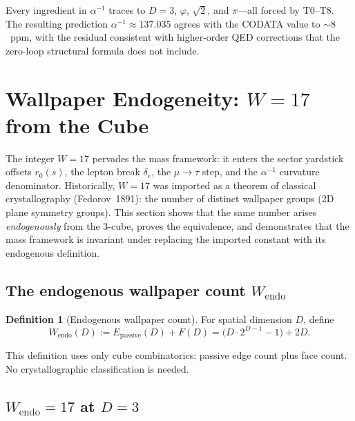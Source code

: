\documentclass[11pt,a4paper]{article}
\theoremstyle{definition}
\newtheorem{definition}[theorem]{Definition}
\theoremstyle{remark}
\newcommand{\phig}{\varphi}
\newcommand{\Epass}{E_{\mathrm{passive}}}
\begin{document}
\noindent
Every ingredient in $\alpha^{-1}$ traces to $D = 3$, $\phig$, $\sqrt{2}$,
and $\pi$---all forced by T0--T8.  The resulting prediction
$\alpha^{-1} \approx 137.035$ agrees with the CODATA value to $\sim 8$~ppm,
with the residual consistent with higher-order QED corrections that the
zero-loop structural formula does not include.


\section{Wallpaper Endogeneity: $W = 17$ from the Cube}
\label{sec:wallpaper}

The integer $W = 17$ pervades the mass framework: it enters the sector
yardstick offsets $r_0(s)$, the lepton break $\delta_e$, the $\mu\to\tau$
step, and the $\alpha^{-1}$ curvature denominator.  Historically, $W = 17$
was imported as a theorem of classical crystallography (Fedorov~1891): the
number of distinct wallpaper groups (2D plane symmetry groups).  This section
shows that the same number arises \emph{endogenously} from the 3-cube,
proves the equivalence, and demonstrates that the mass framework is invariant
under replacing the imported constant with its endogenous definition.

\subsection{The endogenous wallpaper count $W_{\mathrm{endo}}$}

\begin{definition}[Endogenous wallpaper count]
\label{def:W_endo_sec12}
For spatial dimension $D$, define
\begin{equation}
  W_{\mathrm{endo}}(D) := \Epass(D) + F(D)
  = \bigl(D \cdot 2^{D-1} - 1\bigr) + 2D.
  \label{eq:W_endo_def}
\end{equation}
\end{definition}

\noindent
This definition uses only cube combinatorics: passive edge count plus face
count.  No crystallographic classification is needed.

\subsection{$W_{\mathrm{endo}} = 17$ at $D = 3$}
\end{document}
